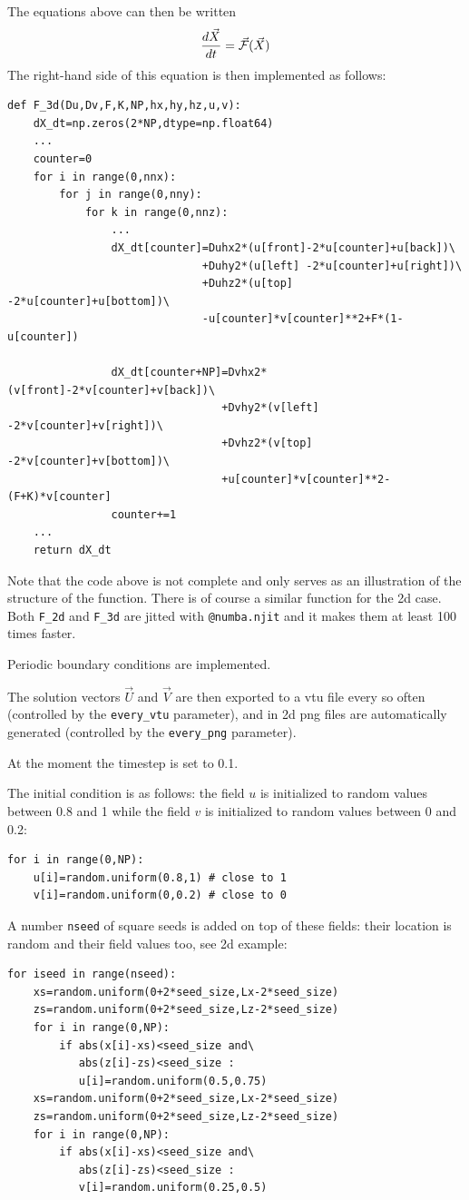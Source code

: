 The equations above can then be written 
\[
\frac{d\vec{X}}{dt} 
= \vec{\cal F} (\vec{X})
\]
The right-hand side of this equation is then implemented as follows:
\begin{lstlisting}
def F_3d(Du,Dv,F,K,NP,hx,hy,hz,u,v):
    dX_dt=np.zeros(2*NP,dtype=np.float64)
    ...
    counter=0
    for i in range(0,nnx):
        for j in range(0,nny):
            for k in range(0,nnz):
                ...
                dX_dt[counter]=Duhx2*(u[front]-2*u[counter]+u[back])\
                              +Duhy2*(u[left] -2*u[counter]+u[right])\
                              +Duhz2*(u[top]  -2*u[counter]+u[bottom])\
                              -u[counter]*v[counter]**2+F*(1-u[counter])

                dX_dt[counter+NP]=Dvhx2*(v[front]-2*v[counter]+v[back])\
                                 +Dvhy2*(v[left] -2*v[counter]+v[right])\
                                 +Dvhz2*(v[top]  -2*v[counter]+v[bottom])\
                                 +u[counter]*v[counter]**2-(F+K)*v[counter]
                counter+=1
    ...
    return dX_dt
\end{lstlisting}
Note that the code above is not complete and only serves as an 
illustration of the structure of the function.
There is of course a similar function for the 2d case.
Both \lstinline{F_2d} and \lstinline{F_3d} are jitted with
\lstinline{@numba.njit} and it makes them at least 100 times faster.

Periodic boundary conditions are implemented.

The solution vectors $\vec{U}$ and $\vec{V}$ are then exported to 
a vtu file every so often (controlled by the \lstinline{every_vtu} parameter),
and in 2d png files are automatically generated (controlled by 
the \lstinline{every_png} parameter).

At the moment the timestep is set to 0.1.

The initial condition is as follows: the field $u$ is initialized
to random values between 0.8 and 1 while the field $v$ is 
initialized to random values between 0 and 0.2:
\begin{lstlisting}
for i in range(0,NP):
    u[i]=random.uniform(0.8,1) # close to 1
    v[i]=random.uniform(0,0.2) # close to 0 
\end{lstlisting}
A number \lstinline{nseed} of square seeds is added on top
of these fields: their location is random and their field values too,
see 2d example:
\begin{lstlisting}
for iseed in range(nseed):
    xs=random.uniform(0+2*seed_size,Lx-2*seed_size)
    zs=random.uniform(0+2*seed_size,Lz-2*seed_size)
    for i in range(0,NP):
        if abs(x[i]-xs)<seed_size and\
           abs(z[i]-zs)<seed_size :
           u[i]=random.uniform(0.5,0.75)
    xs=random.uniform(0+2*seed_size,Lx-2*seed_size)
    zs=random.uniform(0+2*seed_size,Lz-2*seed_size)
    for i in range(0,NP):
        if abs(x[i]-xs)<seed_size and\
           abs(z[i]-zs)<seed_size :
           v[i]=random.uniform(0.25,0.5)
\end{lstlisting}

